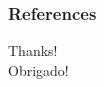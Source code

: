 \documentclass{beamer}
\begin{document}
\begin{frame}
  \frametitle{References}

  \footnotesize
  
  

\end{frame}

\begin{frame}

  \begin{center}
    \Huge
    Thanks! \\
    Obrigado!
  \end{center}

\end{frame}
\end{document}

